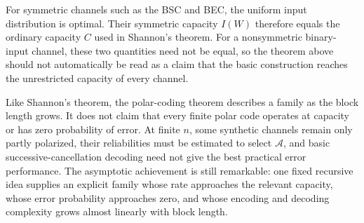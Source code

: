 For symmetric channels such as the BSC and BEC, the uniform input distribution is optimal. Their symmetric capacity $I(W)$ therefore equals the ordinary capacity $C$ used in Shannon's theorem. For a nonsymmetric binary-input channel, these two quantities need not be equal, so the theorem above should not automatically be read as a claim that the basic construction reaches the unrestricted capacity of every channel.

Like Shannon's theorem, the polar-coding theorem describes a family as the block length grows. It does not claim that every finite polar code operates at capacity or has zero probability of error. At finite $n$, some synthetic channels remain only partly polarized, their reliabilities must be estimated to select $\mathcal{A}$, and basic successive-cancellation decoding need not give the best practical error performance. The asymptotic achievement is still remarkable: one fixed recursive idea supplies an explicit family whose rate approaches the relevant capacity, whose error probability approaches zero, and whose encoding and decoding complexity grows almost linearly with block length.